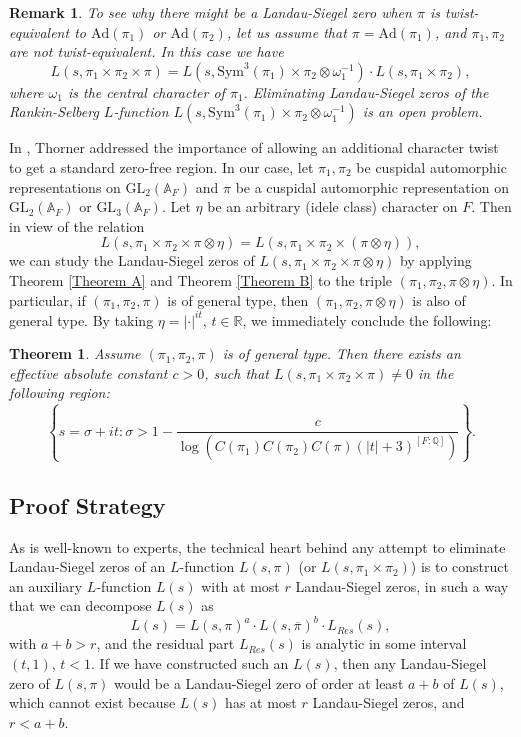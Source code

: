 \documentclass[12pt]{amsart}
\newcommand{\bA}{\mathbb{A}}
\newcommand{\bR}{\mathbb{R}}
\newcommand{\Ad}{\text{Ad}}
\newcommand{\bQ}{\mathbb{Q}}
\newcommand{\Sym}{\text{Sym}}
\newcommand{\GL}{\text{GL}}
\newcommand{\ov}{\overline}
\newtheorem{remark}{Remark}[section]
\newtheorem{thmx}{Theorem}
\begin{document}
\begin{remark}
    To see why there might be a Landau-Siegel zero when $\pi$ is twist-equivalent to $\Ad(\pi_1)$ or $\Ad(\pi_2)$, let us assume that $\pi = \Ad(\pi_1)$, and $\pi_1,\pi_2$ are not twist-equivalent. In this case we have 
    \begin{equation*}
        L(s,\pi_1 \times \pi_2 \times \pi) = L(s,\Sym^3(\pi_1) \times \pi_2 \otimes \omega_1^{-1}) \cdot L(s,\pi_1 \times \pi_2),
    \end{equation*}
    where $\omega_1$ is the central character of $\pi_1$. Eliminating Landau-Siegel zeros of the Rankin-Selberg $L$-function $L(s,\Sym^3(\pi_1) \times \pi_2 \otimes \omega_1^{-1})$ is an open problem.
\end{remark}

In \cite{Thorner2025}\cite{Thorner2025symmetricsquare}, Thorner addressed the importance of allowing an additional character twist to get a standard zero-free region. In our case, let $\pi_1,\pi_2$ be cuspidal automorphic representations on $\GL_2(\bA_F)$ and $\pi$ be a cuspidal automorphic representation on $\GL_2(\bA_F)$ or $\GL_3(\bA_F)$. Let $\eta$ be an arbitrary (idele class) character on $F$. Then in view of the relation
$$L(s,\pi_1 \times \pi_2 \times \pi \otimes \eta) = L(s,\pi_1 \times \pi_2 \times (\pi \otimes \eta)),$$
we can study the Landau-Siegel zeros of $L(s,\pi_1 \times \pi_2 \times \pi \otimes \eta)$ by applying Theorem \ref{Theorem A} and Theorem \ref{Theorem B} to the triple $(\pi_1,\pi_2,\pi \otimes \eta)$. In particular, if $(\pi_1,\pi_2,\pi)$ is of general type, then $(\pi_1,\pi_2,\pi \otimes \eta)$ is also of general type. By taking $\eta = |\cdot|^{it}$, $t \in \bR$, we immediately conclude the following:

\begin{thmx}
     Assume $(\pi_1,\pi_2,\pi)$ is of general type. Then there exists an effective absolute constant $c>0$, such that $L(s,\pi_1 \times \pi_2 \times \pi) \neq 0$ in the following region:
    $$\left\{s = \sigma +it: \sigma > 1-\frac{c}{\log (C(\pi_1)C(\pi_2)C(\pi)(|t|+3)^{[F:\bQ]})}\right\}.$$
\end{thmx}

\subsection{Proof Strategy}

As is well-known to experts, the technical heart behind any attempt to eliminate Landau-Siegel zeros of an $L$-function $L(s,\pi)$ (or $L(s,\pi_1 \times \pi_2)$) is to construct an auxiliary $L$-function $L(s)$ with at most $r$ Landau-Siegel zeros, in such a way that we can decompose $L(s)$ as 
\begin{equation*}
    L(s) = L(s,\pi)^a \cdot L(s,\ov{\pi})^b \cdot L_{Res}(s),
\end{equation*}
with $a+b > r$, and the residual part $L_{Res}(s)$ is analytic in some interval $(t,1)$, $t<1$. If we have constructed such an $L(s)$, then any Landau-Siegel zero of $L(s,\pi)$ would be a Landau-Siegel zero of order at least $a+b$ of $L(s)$, which cannot exist because $L(s)$ has at most $r$ Landau-Siegel zeros, and $r<a+b$. 
\end{document}

